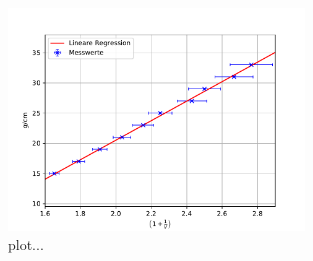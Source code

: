 \begin{figure}
  \centering
  \includegraphics[width = 0.7\textwidth]{../Messdaten/plots/abbe_plot_g.pdf}
  \caption{plot...}
  \label{fig: abbe_g}
\end{figure}


